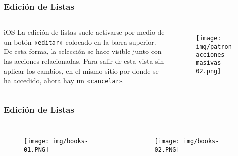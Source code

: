 \documentclass{beamer}
\begin{document}
\begin{frame}
\frametitle{Edición de Listas}

\begin{columns}[c] %

\begin{block}{iOS}
\justify
La edición de listas suele activarse por medio de un botón «\texttt{editar}» colocado en la barra superior. De esta forma, la selección se hace visible junto con las acciones relacionadas. Para salir de esta vista sin aplicar los cambios, en el mismo sitio por donde se ha accedido, ahora hay un «\texttt{cancelar}».
\end{block}

\begin{figure}[H]
  \centering
  \texttt{[image: img/patron-acciones-masivas-02.png]}
\end{figure}
\end{columns}
\end{frame}


\begin{frame}
\frametitle{Edición de Listas}

\begin{columns}[c] %

\begin{figure}[H]
  \centering
  \texttt{[image: img/books-01.PNG]}
\end{figure}

\begin{figure}[H]
  \centering
  \texttt{[image: img/books-02.PNG]}
\end{figure}

\end{columns}
\end{frame}

\end{document}
